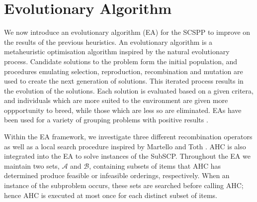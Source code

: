 \documentclass{elsarticle}
\begin{document}
\section{Evolutionary Algorithm}
\label{sec:ea}
\noindent We now introduce an evolutionary algorithm (EA) for the SCSPP to improve on the results of the previous heuristics. An evolutionary algorithm is a metaheuristic optimisation algorithm inspired by the natural evolutionary process. Candidate solutions to the problem form the initial population, and procedures emulating selection, reproduction, recombination and mutation are used to create the next generation of solutions. This iterated process results in the evolution of the solutions. Each solution is evaluated based on a given critera, and individuals which are more suited to the environment are given more oppportunity to breed, while those which are less so are eliminated. EAs have been used for a variety of grouping problems with positive results .

Within the EA framework, we investigate three different recombination operators as well as a local search procedure inspired by Martello and Toth \cite{martello1990l}. AHC is also integrated into the EA to solve instances of the SubSCP. Throughout the EA we maintain two sets, $\mathcal{A}$ and $\mathcal{B}$, containing subsets of items that AHC has determined produce feasible or infeasible orderings, respectively. When an instance of the subproblem occurs, these sets are searched before calling AHC; hence AHC is executed at most once for each distinct subset of items.

\begin{comment}
{\color{myRed}
\begin{itemize}[leftmargin=*]
	\item
	\idone{Why use an EA? Lit review of EAs in BPP problems, benefits (repeated multiple times, best characteristics of strips/solutions).}
	\idone{Whenever subproblem occurs, AHC will be used.}
	\idone{Sets $\mathcal{A}$ and $\mathcal{B}$, subsets of items that produce feasible/infeasible orderings determined by AHC. Search these sets before calling AHC, therefore AHC used at most once for each distinct subset of items $\mathcal{I}' \subseteq \mathcal{I}$.}
	\idone{Feasible solution $\mathcal{S}$ means solution abides by all constraints.}
\end{itemize}
}
\end{comment}
\end{document}
